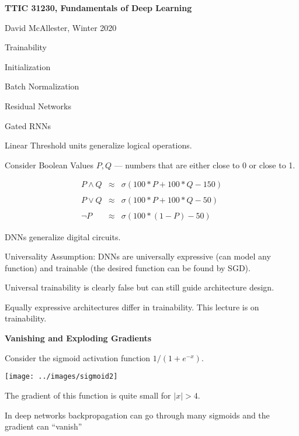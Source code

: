 




{\Huge

  \centerline{\bf TTIC 31230, Fundamentals of Deep Learning}
  \bigskip
  \centerline{David McAllester, Winter 2020}
  \vfill
  \centerline{Trainability}
  \vfill
  \vfill
  \centerline{Initialization}
  \vfill
  \centerline{Batch Normalization}
  \vfill
  \centerline{Residual Networks}
  \vfill
  \centerline{Gated RNNs}


Linear Threshold units generalize logical operations.

\vfill
Consider Boolean Values $P,Q$ --- numbers that are either close to 0 or close to 1.

\vfill
\begin{eqnarray*}
P \wedge Q & \approx & \sigma(100*P + 100* Q -150) \\
\\
P \vee Q & \approx & \sigma(100*P + 100* Q -50) \\
\\
\neg P & \approx & \sigma(100*(1-P) - 50)
\end{eqnarray*}

\vfill
DNNs generalize digital circuits.


{\color{red} Universality Assumption:} DNNs are universally expressive (can model any function) and trainable (the desired function can be found by SGD).

\vfill
Universal trainability is clearly false but can still guide architecture design.

\vfill
Equally expressive architectures differ in trainability.  This lecture is on trainability.

\slide{}

\centerline{\bf Vanishing and Exploding Gradients}
\vfill
\vfill


Consider the sigmoid activation function $1/(1+ e^{-x})$.

\vfill
\centerline{\texttt{[image: ../images/sigmoid2]}}


\vfill
The gradient of this function is quite small for $|x| > 4$.

\vfill
In deep networks backpropagation can go through many sigmoids and
the gradient can ``vanish''

}
